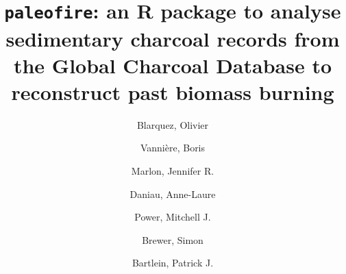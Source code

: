 \documentclass{elsarticle}
\begin{document}




\begin{frontmatter}

\title{\texttt{paleofire}: an R package to analyse sedimentary charcoal records from the Global Charcoal Database to reconstruct past biomass burning}

\author[1,2]{Blarquez, Olivier}

\author[3]{Vannière, Boris}

\author[4]{Marlon, Jennifer R.}

\author[5]{Daniau, Anne-Laure}

\author[7]{Power, Mitchell J.}

\author[8]{Brewer, Simon}

\author[9]{Bartlein, Patrick J.}

\address[1]{Centre d'étude de la Forêt, Université du Québec à Montréal, Montréal, Québec, Canada}

\address[2]{Natural Sciences and Engineering Research Council of Canada Industrial Chair in Sustainable Forest Management, Forest Research Institute, Université du Québec en Abitibi-Témiscamingue, Rouyn-Noranda, Québec, Canada}

\address[3]{Centre National de la Recherche Scientifique (CNRS), UMR Chrono-Environment, Besançon, France}

\address[4]{Yale School Forestry and Environmental Studies, Yale University, New Haven, Connecticut, USA}

\address[5]{Centre National de la Recherche Scientifique (CNRS), Environnements et Paléoenvironnements Océaniques et Continentaux (EPOC), Unité Mixte de Recherche (UMR) 5805, Université de Bordeaux, Talence, France}

\address[7]{Natural History Museum of Utah and Department of Geography, University of Utah, Salt Lake City, Utah, USA}

\address[8]{Department of Geography, University of Utah, Salt Lake City, Utah, USA}


\end{frontmatter}
\end{document}
